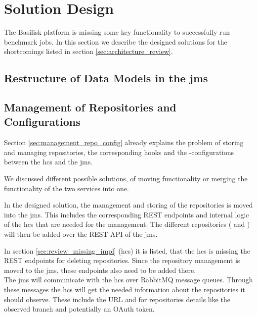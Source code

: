 \section{Solution Design}
\label{sec:solution_design}

The Basilisk platform is missing some key functionality to successfully run benchmark jobs.
In this section we describe the designed solutions for the shortcomings listed in section \ref{sec:architecture_review}.


\subsection{Restructure of Data Models in the \acl{jms}}
\label{sec:data_model_restructure_jms}




\subsection{Management of Repositories and Configurations}
\label{sec:management_repo_config_design}
Section \ref{sec:management_repo_config} already explains the problem of storing and managing repositories, the corresponding hooks and the \ts{}-configurations between the \acf{hcs} and the \acf{jms}.

We discussed different possible solutions, of moving functionality or merging the functionality of the two services into one.

In the designed solution, the management and storing of the repositories is moved into the \ac{jms}.
This includes the corresponding REST endpoints and internal logic of the \ac{hcs} that are needed for the management.
The different repositories (\gh{} and \dockh{}) will then be added over the REST API of the \ac{jms}.

In section \ref{sec:review_missing_impl} (\acl{hcs}) it is listed, that the \ac{hcs} is missing the REST endpoints for deleting repositories.
Since the repository management is moved to the \ac{jms}, these endpoints also need to be added there.
\\

The \ac{jms} will communicate with the \ac{hcs} over RabbitMQ message queues.
Through these messages the \ac{hcs} will get the needed information about the repositories it should observe.
These include the URL and for \gh{} repositories details like the observed branch and potentially an OAuth token.

